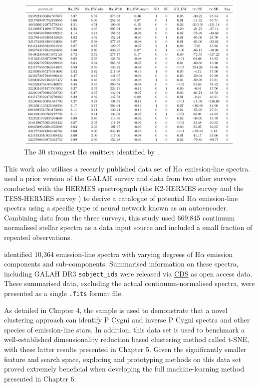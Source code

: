 \begin{figure}[!htb]
\centering
\includegraphics[scale=.45]{figures/cotartable.png}
\caption{The 30 strongest H$\alpha$ emitters identified by \citet{vcotar2021galah}.}
\end{figure}

This work also utilises a recently published data set of H$\alpha$ emission-line spectra. \citet{vcotar2021galah} used a prior version of the GALAH survey \citep{de2015galah} and data from two other surveys conducted with the HERMES spectrograph (the K2-HERMES survey \citep{wittenmyer2018k2} and the TESS-HERMES survey \citep{sharma2018tess}) to derive a catalogue of potential H$\alpha$ emission-line spectra using a specific type of neural network known as an autoencoder. Combining data from the three surveys, this study used 669,845 continuum normalised stellar spectra as a data input source and included a small fraction of repeated observations. 

\citet{vcotar2021galah} identified 10,364 emission-line spectra with varying degrees of H$\alpha$ emission components and sub-components. Summarised information on these spectra, including GALAH DR3 \texttt{sobject\_ids} were released via \href{https://cdsweb.u-strasbg.fr/}{CDS} as open access data. These summarised data, excluding the actual continuum-normalised spectra, were presented as a single \texttt{.fits} format file. 

As detailed in Chapter 4, the \citet{vcotar2021galah} sample is used to demonstrate that a novel clustering approach can identify P Cygni and inverse P Cygni spectra and other species of emission-line stars. In addition, this data set is used to benchmark a well-established dimensionality reduction based clustering method called t-SNE, with these latter results presented in Chapter 5. Given the significantly smaller feature and search space, exploring and prototyping methods on this data set proved extremely beneficial when developing the full machine-learning method presented in Chapter 6.

